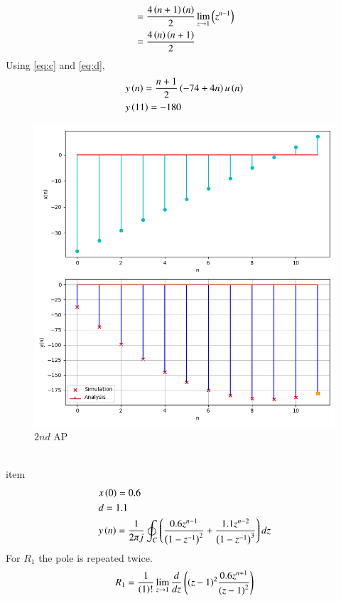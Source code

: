 \documentclass[journal,12pt,twocolumn]{IEEEtran}
\theoremstyle{remark}
\begin{document}
\begin{enumerate}[label=(\alph*)]
\begin{align}
    &=\frac{4\left(n+1\right)\left(n\right)}{2}\lim\limits_{z\to 1}\left(z^{n-1}\right)\\
    &=\frac{4\left(n\right)\left(n+1\right)}{2}\label{eq:d}
\end{align}
Using \eqref{eq:c} and \eqref{eq:d},
\begin{align}
    &y\left(n\right)=\dfrac{n+1}{2}\left(-74+4n\right)u\left(n\right)\\
    &y\left(11\right)=-180
\end{align}
    \begin{figure}[h!]
        \centering
        \includegraphics[width=\columnwidth]{figs/plt2.png}
        \caption{$2nd$ AP}
    \end{figure}
    \\item \begin{align}
        &x\left(0\right)=0.6 \\
        &d=1.1 \\
        &y\left(n\right)=\frac{1}{2\pi j}\oint_{C}\left(\dfrac{0.6z^{n-1}}{\left(1-z^{-1}\right)^2} + \dfrac{1.1z^{n-2}}{\left(1-z^{-1}\right)^{3}}\right)dz \\
    \end{align}
    For $R_1$ the pole is repeated twice.
\begin{align}
    R_1&=\frac{1}{\brak {1}!}\lim\limits_{z\to 1}\frac{d}{dz}\brak {{\brak{z-1}}^{2}\frac{0.6z^{n+1}}{{\brak{z-1}}^2}}\\

\end{align}
\end{enumerate}
\end{document}
